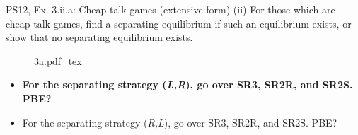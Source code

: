 \begin{frame}{PS12, Ex. 3.ii.a: Cheap talk games (extensive form)}
    (ii) For those which are cheap talk games, find a separating equilibrium if such an equilibrium exists, or show that no separating equilibrium exists.\vspace{-6pt}
    \begin{multicols}{2}
      \begin{figure}[!h]
        \center{}
        {3a.pdf_tex}
      \end{figure}\vspace{-6pt}
      \begin{itemize}
        \item[Step 1:] \textbf{For the separating strategy (\textit{L,R}), go over SR3, SR2R, and SR2S. PBE?}
        \item[Step 2:] For the separating strategy (\textit{R,L}), go over SR3, SR2R, and SR2S. PBE?
      \end{itemize}
      \vfill\null\columnbreak
      \vfill\null
    \end{multicols}
\end{frame}
